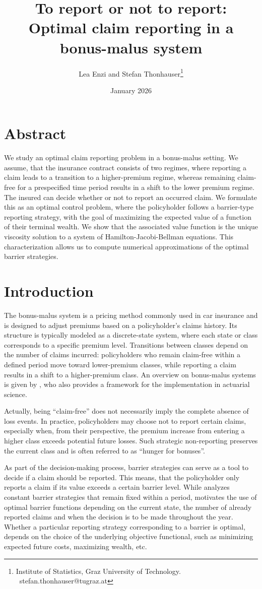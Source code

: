 \documentclass[a4paper]{scrartcl}
\title{To report or not to report:\\
Optimal claim reporting in a bonus-malus system}
\date{\normalsize January 2026}
\author{Lea Enzi and Stefan Thonhauser\thanks{Institute of Statistics, Graz University of Technology.\\\Letter~stefan.thonhauser@tugraz.at} }
\theoremstyle{remark}
\theoremstyle{definition}
\numberwithin{equation}{section}
\begin{document}
\maketitle	

\section*{Abstract}
We study an optimal claim reporting problem in a bonus-malus setting. We assume, that the insurance contract consists of two regimes, where reporting a claim leads to a transition to a higher-premium regime, whereas remaining claim-free for a prespecified time period results in a shift to the lower premium regime. The insured can decide whether or not to report an occurred claim.
We formulate this as an optimal control problem, where the policyholder follows a barrier-type reporting strategy, with the goal of maximizing the expected value of a function of their terminal wealth.
We show that the associated value function is the unique viscosity solution to a system of Hamilton-Jacobi-Bellman equations. This characterization allows us to compute numerical approximations of the optimal barrier strategies.


\section{Introduction}
The bonus-malus system is a pricing method commonly used in car insurance and is designed to adjust premiums based on a policyholder's claims history. Its structure is typically modeled as a discrete-state system, where each state or class corresponds to a specific premium level. Transitions between classes depend on the number of claims incurred: policyholders who remain claim-free within a defined period move toward lower-premium classes, while reporting a claim results in a shift to a higher-premium class. An overview on bonus-malus systems is given by \cite{Lemaire.1998}, who also provides a framework for the implementation in actuarial science.  


Actually, being “claim-free” does not necessarily imply the complete absence of loss events. In practice, policyholders may choose not to report certain claims, especially when, from their perspective, the premium increase from entering a higher class exceeds potential future losses. Such strategic non-reporting preserves the current class and is often referred to as ``hunger for bonuses''. 

As part of the decision-making process, barrier strategies can serve as a tool to decide if a claim should be reported. This means, that the policyholder only reports a claim if its value exceeds a certain barrier level. While \cite{Straub} analyzes constant barrier strategies that remain fixed within a period, \cite{Lanzenauer1974} motivates the use of optimal barrier functions depending on the current state, the number of already reported claims and when the decision is to be made throughout the year. Whether a particular reporting strategy corresponding to a barrier is optimal, depends on the choice of the underlying objective functional, such as minimizing expected future costs, maximizing wealth, etc. 
\end{document}
